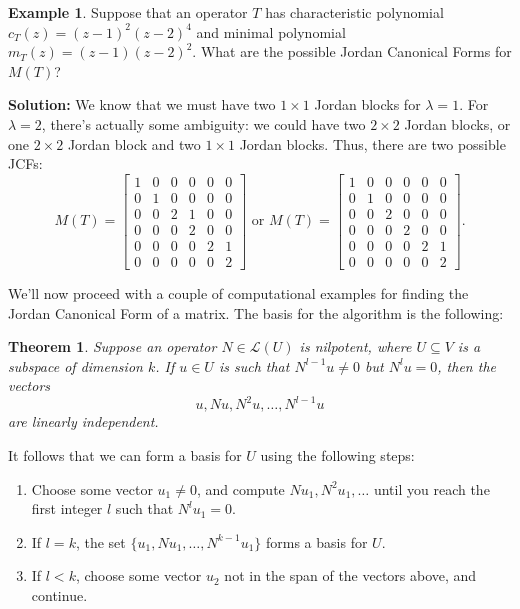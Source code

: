 \documentclass[12pt,letterpaper]{article}
\newtheorem{theorem}{Theorem}
\theoremstyle{definition}
\newtheorem{example}{Example}
\renewcommand{\L}{\mathcal{L}}
\begin{document}
\begin{example}
 Suppose that an operator $T$ has characteristic polynomial $c_T(z) = (z-1)^2(z-2)^4$ and minimal polynomial $m_T(z) = (z-1)(z-2)^2$. What are the possible Jordan Canonical Forms for $M(T)$?

\bigskip

{\bf Solution:} We know that we must have two $1\times 1$ Jordan blocks for $\lambda=1$. For $\lambda=2$, there's actually some ambiguity: we could have two $2\times 2$ Jordan blocks, or one $2\times 2$ Jordan block and two $1\times 1$ Jordan blocks. Thus, there are two possible JCFs:
\[
 M(T) = \begin{bmatrix}1&0&0&0&0&0\\
          0&1&0&0&0&0\\
          0&0&2&1&0&0\\
          0&0&0&2&0&0\\
          0&0&0&0&2&1\\
          0&0&0&0&0&2
         \end{bmatrix}
\text{ or }
M(T) = \begin{bmatrix}1&0&0&0&0&0\\
          0&1&0&0&0&0\\
          0&0&2&0&0&0\\
          0&0&0&2&0&0\\
          0&0&0&0&2&1\\
          0&0&0&0&0&2
         \end{bmatrix}.
\]
\end{example}
We'll now proceed with a couple of computational examples for finding the Jordan Canonical Form of a matrix. The basis for the algorithm is the following:
\begin{theorem}
 Suppose an operator $N\in\L(U)$ is nilpotent, where $U\subseteq V$ is a subspace of dimension $k$. If $u\in U$ is such that $N^{l-1}u\neq 0$ but $N^{l}u=0$, then the vectors
\[
 u, Nu, N^2u,\ldots, N^{l-1}u
\]
are linearly independent. 
\end{theorem}
It follows that we can form a basis for $U$ using the following steps:
\begin{enumerate}
 \item Choose some vector $u_1\neq 0$, and compute $Nu_1, N^2u_1,\ldots$ until you reach the first integer $l$ such that $N^lu_1=0$.
 \item If $l=k$, the set $\{u_1,Nu_1,\ldots, N^{k-1}u_1\}$ forms a basis for $U$.
 \item If $l<k$, choose some vector $u_2$ not in the span of the vectors above, and continue.
\end{enumerate}
\end{document}
